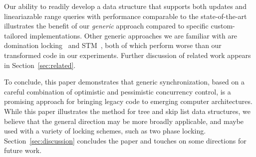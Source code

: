 Our ability to readily develop a data structure that supports both updates and lineariazable range queries with 
performance comparable to the state-of-the-art illustrates the benefit of 
our \emph{generic} approach compared to specific custom-tailored implementations.
%
Other generic approaches we are familiar with are domination locking~\cite{Gueta2011} and STM~\cite{DiceSS2006}, both of which perform worse than our transformed code in our experiments. 
%
Further discussion of related work appears in Section~\ref{sec:related}.

To conclude, this paper demonstrates that generic synchronization, based on a careful combination of optimistic and
pessimistic concurrency control, is a promising approach for bringing legacy code to emerging computer architectures.
While this paper illustrates the method for tree and skip list data structures, we believe that the general direction may be more broadly applicable, and maybe used with a variety of locking schemes, such as two phase locking.
Section~\ref{sec:discussion} concludes the paper and touches on some directions for future work. 